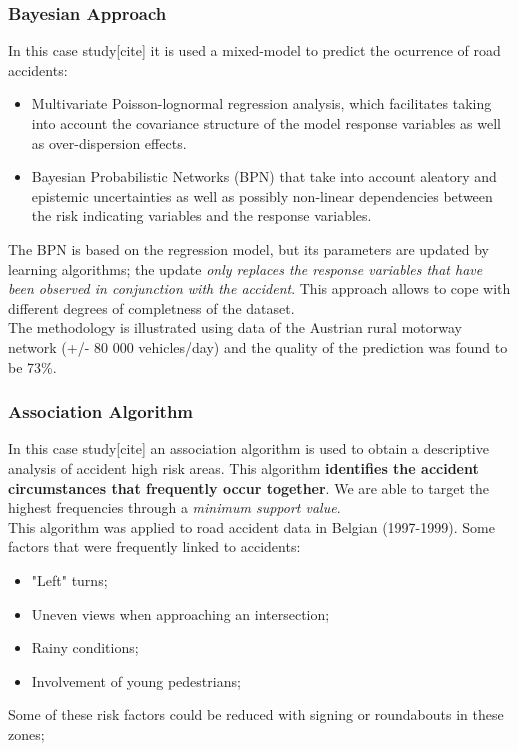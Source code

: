 \documentclass[hyperref={pdfpagelabels=true}]{beamer}
\begin{document}
\begin{frame}
\frametitle{Bayesian Approach}
In this case study[cite] it is used a mixed-model to predict the ocurrence of road accidents:
\begin{itemize}
\item<2-> Multivariate Poisson-lognormal regression analysis, which facilitates taking into account the covariance structure of the model response variables as well as
over-dispersion effects.
\item<3->  Bayesian Probabilistic Networks (BPN) that take into account aleatory and epistemic uncertainties as well as possibly non-linear dependencies between the risk indicating variables and the response variables.
\end{itemize}
The BPN is based on the regression model, but its parameters are updated by learning algorithms; the update \textit{only replaces the response variables that have been observed in conjunction with the accident}. This approach allows to cope with different degrees of completness of the dataset.\\
The methodology is illustrated using data of the Austrian rural motorway network (+/- 80 000 vehicles/day) and the quality of the prediction was found to be 73\%.
\end{frame}

\begin{frame}
\frametitle{Association Algorithm}
In this case study[cite] an association algorithm is used to obtain a descriptive analysis of accident high risk areas. This algorithm \textbf{identifies the accident circumstances that frequently occur together}. We are able to target the highest frequencies through a \textit{minimum support value}.\\
This algorithm was applied to road accident data in Belgian (1997-1999). 
Some factors that were frequently linked to accidents:
\begin{itemize}
\item "Left" turns;
\item Uneven views when approaching an intersection;
\item Rainy conditions;
\item Involvement of young pedestrians;
\end{itemize}
Some of these risk factors could be reduced with signing or roundabouts in these zones;
\end{frame}
\end{document}
